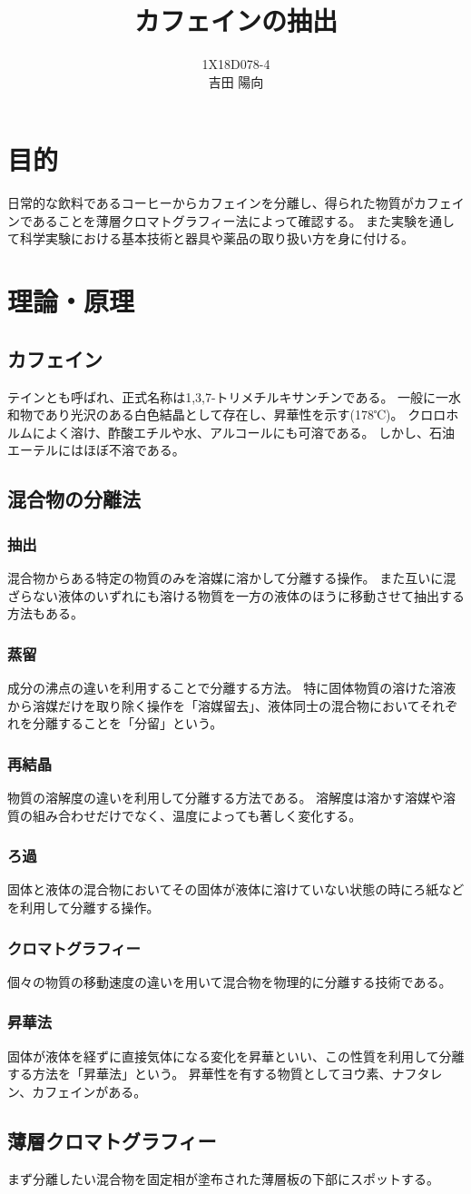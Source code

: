 \documentclass[11pt]{jsarticle}
\begin{document}
\title{カフェインの抽出}
\author{1X18D078-4 \\ 吉田 陽向}
\maketitle
\newpage
\section{目的}
日常的な飲料であるコーヒーからカフェインを分離し、得られた物質がカフェインであることを薄層クロマトグラフィー法によって確認する。
また実験を通して科学実験における基本技術と器具や薬品の取り扱い方を身に付ける。
\section{理論・原理}
\subsection{カフェイン}
テインとも呼ばれ、正式名称は1,3,7-トリメチルキサンチンである。
一般に一水和物であり光沢のある白色結晶として存在し、昇華性を示す(178℃)。
クロロホルムによく溶け、酢酸エチルや水、アルコールにも可溶である。
しかし、石油エーテルにはほぼ不溶である。
\subsection{混合物の分離法}
\subsubsection{抽出}
混合物からある特定の物質のみを溶媒に溶かして分離する操作。
また互いに混ざらない液体のいずれにも溶ける物質を一方の液体のほうに移動させて抽出する方法もある。
\subsubsection{蒸留}
成分の沸点の違いを利用することで分離する方法。
特に固体物質の溶けた溶液から溶媒だけを取り除く操作を「溶媒留去」、液体同士の混合物においてそれぞれを分離することを「分留」という。
\subsubsection{再結晶}
物質の溶解度の違いを利用して分離する方法である。
溶解度は溶かす溶媒や溶質の組み合わせだけでなく、温度によっても著しく変化する。
\subsubsection{ろ過}
固体と液体の混合物においてその固体が液体に溶けていない状態の時にろ紙などを利用して分離する操作。
\subsubsection{クロマトグラフィー}
個々の物質の移動速度の違いを用いて混合物を物理的に分離する技術である。
\subsubsection{昇華法}
固体が液体を経ずに直接気体になる変化を昇華といい、この性質を利用して分離する方法を「昇華法」という。
昇華性を有する物質としてヨウ素、ナフタレン、カフェインがある。
\subsection{薄層クロマトグラフィー}
まず分離したい混合物を固定相が塗布された薄層板の下部にスポットする。
\end{document}
